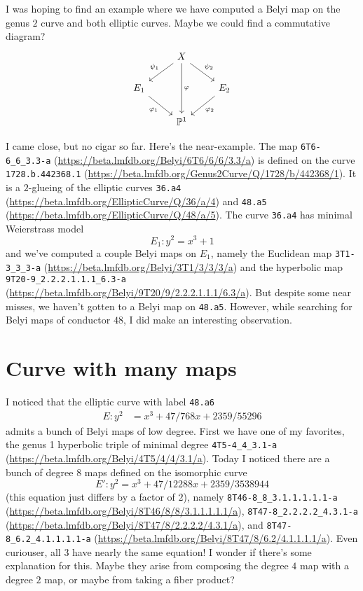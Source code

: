 \documentclass[reqno, 12pt]{amsart}
\theoremstyle{definition}
\theoremstyle{remark}
\renewcommand{\P}{\mathbb P}
\begin{document}
I was hoping to find an example where we have computed a Belyi map on the genus $2$ curve and both elliptic curves. Maybe we could find a commutative diagram?
$$
\begin{tikzcd}
{} & X \ar[swap]{dl}{\psi_1} \ar[]{dr}{\psi_2} \ar[]{dd}{\varphi}& {}\\
E_1 \ar[swap]{dr}{\varphi_1} & {} & E_2 \ar[]{dl}{\varphi_2}\\
{} & \P^1 & {}
\end{tikzcd}
$$

I came close, but no cigar so far. Here's the near-example. The map \texttt{6T6-6\_6\_3.3-a} (\url{https://beta.lmfdb.org/Belyi/6T6/6/6/3.3/a}) is defined on the curve \texttt{1728.b.442368.1} (\url{https://beta.lmfdb.org/Genus2Curve/Q/1728/b/442368/1}). It is a $2$-glueing of the elliptic curves \texttt{36.a4} (\url{https://beta.lmfdb.org/EllipticCurve/Q/36/a/4}) and \texttt{48.a5} (\url{https://beta.lmfdb.org/EllipticCurve/Q/48/a/5}). The curve \texttt{36.a4} has minimal Weierstrass model
$$
E_1: y^2 = x^3 + 1
$$
and we've computed a couple Belyi maps on $E_1$, namely the Euclidean map \texttt{3T1-3\_3\_3-a} (\url{https://beta.lmfdb.org/Belyi/3T1/3/3/3/a}) and the hyperbolic map \texttt{9T20-9\_2.2.2.1.1.1\_6.3-a} (\url{https://beta.lmfdb.org/Belyi/9T20/9/2.2.2.1.1.1/6.3/a}). But despite some near misses, we haven't gotten to a Belyi map on \texttt{48.a5}. However, while searching for Belyi maps of conductor $48$, I did make an interesting observation.

\section{Curve with many maps}

I noticed that the elliptic curve with label \texttt{48.a6}
\begin{align*}
E: y^2 &= x^3 + 47/768 x + 2359/55296
\end{align*}
admits a bunch of Belyi maps of low degree. First we have one of my favorites, the genus 1 hyperbolic triple of minimal degree \texttt{4T5-4\_4\_3.1-a} (\url{https://beta.lmfdb.org/Belyi/4T5/4/4/3.1/a}). Today I noticed there are a bunch of degree 8 maps defined on the isomorphic curve
$$
E': y^2 = x^3 + 47/12288 x + 2359/3538944
$$
(this equation just differs by a factor of $2$), namely \texttt{8T46-8\_8\_3.1.1.1.1.1-a} (\url{https://beta.lmfdb.org/Belyi/8T46/8/8/3.1.1.1.1.1/a}), \texttt{8T47-8\_2.2.2.2\_4.3.1-a} (\url{https://beta.lmfdb.org/Belyi/8T47/8/2.2.2.2/4.3.1/a}), and \texttt{8T47-8\_6.2\_4.1.1.1.1-a} (\url{https://beta.lmfdb.org/Belyi/8T47/8/6.2/4.1.1.1.1/a}). Even curiouser, all 3 have nearly the same equation! I wonder if there's some explanation for this. Maybe they arise from composing the degree $4$ map with a degree $2$ map, or maybe from taking a fiber product?
\end{document}
